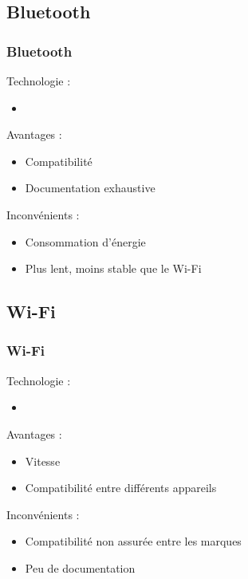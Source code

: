 \documentclass{beamer}
\begin{document}
      \subsection{Bluetooth}
      \begin{frame}
	  \frametitle{Bluetooth}
	  \begin{block}{Technologie :}
	  \begin{itemize}
	   \item 
	  \end{itemize}
	  \end{block}
	  \begin{block}{Avantages :}
	  \begin{itemize}
	   \item Compatibilité
	   \item Documentation exhaustive
	  \end{itemize}
	  \end{block}
	  \begin{block}{Inconvénients :}
	  \begin{itemize}
	   \item Consommation d'énergie
	   \item Plus lent, moins stable que le Wi-Fi
	  \end{itemize}
	  \end{block}
      \end{frame}
      \subsection{Wi-Fi}
      \begin{frame}
	  \frametitle{Wi-Fi}
	  \begin{block}{Technologie :}
	  \begin{itemize}
	   \item 
	  \end{itemize}
	  \end{block}
	  \begin{block}{Avantages :}
	  \begin{itemize}
	   \item Vitesse
	   \item Compatibilité entre différents appareils
	  \end{itemize}
	  \end{block}
	  \begin{block}{Inconvénients :}
	  \begin{itemize}
	   \item Compatibilité non assurée entre les marques
	   \item Peu de documentation
	  \end{itemize}
	  \end{block}
      \end{frame}
\end{document}
